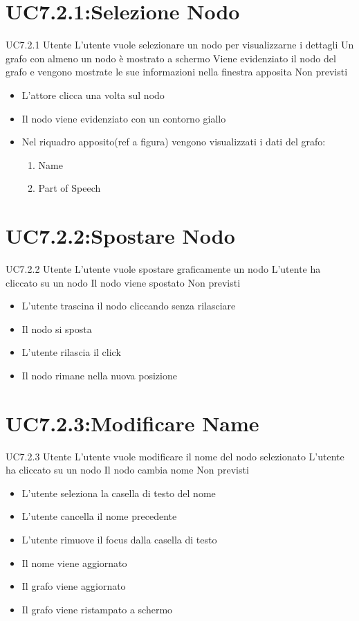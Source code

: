 \documentclass[../AnalisideiRequisiti.tex]{subfiles}
\begin{document}
\section{UC7.2.1:Selezione Nodo}
\UserCase
{UC7.2.1}
{Utente}
{}
{L'utente vuole selezionare un nodo per visualizzarne i dettagli}
{Un grafo con almeno un nodo è mostrato a schermo}
{Viene evidenziato il nodo del grafo e vengono mostrate le sue informazioni nella finestra apposita}
{Non previsti}
{
	\begin{itemize}
		\item{} L'attore clicca una volta sul nodo
		\item{} Il nodo viene evidenziato con un contorno giallo
		\item{} Nel riquadro apposito(ref a figura) vengono visualizzati i dati del grafo:
		\begin{enumerate}
			\item{} Name
			\item{} Part of Speech
		\end{enumerate}
	\end{itemize}
}
\section{UC7.2.2:Spostare Nodo}
\UserCase
{UC7.2.2}
{Utente}
{}
{L'utente vuole spostare graficamente un nodo}
{L'utente ha cliccato su un nodo}
{Il nodo viene spostato}
{Non previsti}
{\begin{itemize}
		\item{} L'utente trascina il nodo cliccando senza rilasciare
		\item{} Il nodo si sposta
		\item{} L'utente rilascia il click
		\item{} Il nodo rimane nella nuova posizione
\end{itemize}
}

\section{UC7.2.3:Modificare Name}
\UserCase
{UC7.2.3}
{Utente}
{}
{L'utente vuole modificare il nome del nodo selezionato}
{L'utente ha cliccato su un nodo}
{Il nodo cambia nome}
{Non previsti}
{\begin{itemize}
		\item{} L'utente seleziona la casella di testo del nome
		\item{} L'utente cancella il nome precedente
		\item{} L'utente rimuove il focus dalla casella di testo
		\item{} Il nome viene aggiornato
		\item{} Il grafo viene aggiornato 
		\item{} Il grafo viene ristampato a schermo 
\end{itemize}}
\end{document}
